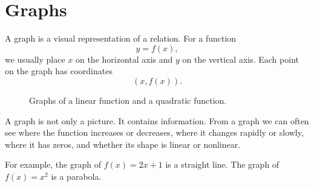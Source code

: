 \section{Graphs}

A graph is a visual representation of a relation. For a function
\[
y=f(x),
\]
we usually place \(x\) on the horizontal axis and \(y\) on the vertical axis. Each point on the graph has coordinates
\[
(x,f(x)).
\]

\begin{figure}[htbp]
\centering

\caption{Graphs of a linear function and a quadratic function.}
\label{fig:mathematical-foundations-function-graphs}
\end{figure}

A graph is not only a picture. It contains information. From a graph we can often see where the function increases or decreases, where it changes rapidly or slowly, where it has zeros, and whether its shape is linear or nonlinear.

For example, the graph of \(f(x)=2x+1\) is a straight line. The graph of \(f(x)=x^2\) is a parabola.
